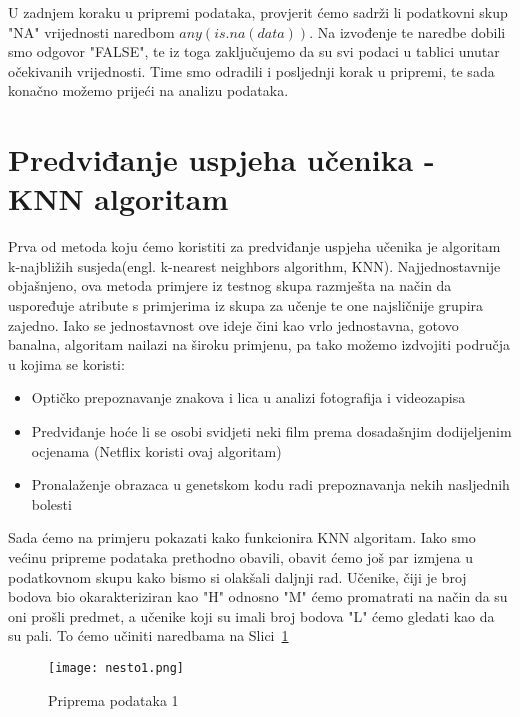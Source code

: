\documentclass[times, utf8, zavrsni, numeric]{fer}
\begin{document}
U zadnjem koraku u pripremi podataka, provjerit ćemo sadrži li podatkovni skup "NA" vrijednosti naredbom  $any(is.na(data))$. Na izvođenje te naredbe dobili smo odgovor "FALSE", te iz toga zaključujemo da su svi podaci u tablici unutar očekivanih vrijednosti. Time smo odradili i posljednji korak u pripremi, te sada konačno možemo prijeći na analizu podataka.

\section{Predviđanje uspjeha učenika - KNN algoritam}
Prva od metoda koju ćemo koristiti za predviđanje uspjeha učenika je algoritam k-najbližih susjeda(engl. k-nearest neighbors algorithm, KNN). Najjednostavnije objašnjeno, ova metoda primjere iz testnog skupa razmješta na način da uspoređuje atribute s primjerima iz skupa za učenje te one najsličnije grupira zajedno. Iako se jednostavnost ove ideje čini kao vrlo jednostavna, gotovo banalna, algoritam nailazi na široku primjenu, pa tako možemo izdvojiti područja u kojima se koristi:
\begin{itemize}
\item Optičko prepoznavanje znakova i lica u analizi fotografija i videozapisa
\item Predviđanje hoće li se osobi svidjeti neki film prema dosadašnjim dodijeljenim ocjenama (Netflix koristi ovaj algoritam)
\item Pronalaženje obrazaca u genetskom kodu radi prepoznavanja nekih nasljednih bolesti
\end{itemize}
Sada ćemo na primjeru pokazati kako funkcionira KNN algoritam. Iako smo većinu pripreme podataka prethodno obavili, obavit ćemo još par izmjena u podatkovnom skupu kako bismo si olakšali daljnji rad. Učenike, čiji je broj bodova bio okarakteriziran kao "H" odnosno "M" ćemo promatrati na način da su oni prošli predmet, a učenike koji su imali broj bodova "L" ćemo gledati kao da su pali. To ćemo učiniti naredbama na Slici~\ref{fig:nesto}

\begin{figure}[H]
\centering
\texttt{[image: nesto1.png]}
\caption{Priprema podataka 1}
\label{fig:nesto}
\end{figure}
\end{document}
